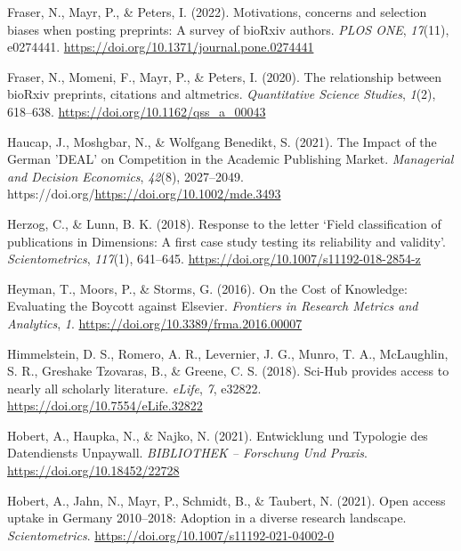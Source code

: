 \documentclass[
]{article}
\newlength{\cslhangindent}
\newlength{\cslentryspacingunit} %
\newenvironment{CSLReferences}[2] %
 {%
  \setlength{\parindent}{0pt}
  \ifodd #1
  \let\oldpar\par
  \def\par{\hangindent=\cslhangindent\oldpar}
  \fi
  \setlength{\parskip}{#2\cslentryspacingunit}
 }%
 {}
\begin{document}
\begin{CSLReferences}{1}{0}
\leavevmode{}%
Fraser, N., Mayr, P., \& Peters, I. (2022). Motivations, concerns and selection biases when posting preprints: {A} survey of {bioRxiv} authors. \emph{PLOS ONE}, \emph{17}(11), e0274441. \url{https://doi.org/10.1371/journal.pone.0274441}

\leavevmode{}%
Fraser, N., Momeni, F., Mayr, P., \& Peters, I. (2020). {The relationship between bioRxiv preprints, citations and altmetrics}. \emph{Quantitative Science Studies}, \emph{1}(2), 618--638. \url{https://doi.org/10.1162/qss_a_00043}

\leavevmode{}%
Haucap, J., Moshgbar, N., \& Wolfgang Benedikt, S. (2021). The {Impact} of the {German} '{DEAL}' on {Competition} in the {Academic} {Publishing} {Market}. \emph{Managerial and Decision Economics}, \emph{42}(8), 2027--2049. https://doi.org/\url{https://doi.org/10.1002/mde.3493}

\leavevmode{}%
Herzog, C., \& Lunn, B. K. (2018). Response to the letter {`{Field} classification of publications in {Dimensions}: A first case study testing its reliability and validity'}. \emph{Scientometrics}, \emph{117}(1), 641--645. \url{https://doi.org/10.1007/s11192-018-2854-z}

\leavevmode{}%
Heyman, T., Moors, P., \& Storms, G. (2016). On the {Cost} of {Knowledge}: {Evaluating} the {Boycott} against {Elsevier}. \emph{Frontiers in Research Metrics and Analytics}, \emph{1}. \url{https://doi.org/10.3389/frma.2016.00007}

\leavevmode{}%
Himmelstein, D. S., Romero, A. R., Levernier, J. G., Munro, T. A., McLaughlin, S. R., Greshake Tzovaras, B., \& Greene, C. S. (2018). Sci-{Hub} provides access to nearly all scholarly literature. \emph{eLife}, \emph{7}, e32822. \url{https://doi.org/10.7554/eLife.32822}

\leavevmode{}%
Hobert, A., Haupka, N., \& Najko, N. (2021). Entwicklung und {Typologie} des {Datendiensts} {Unpaywall}. \emph{BIBLIOTHEK -- Forschung Und Praxis}. \url{https://doi.org/10.18452/22728}

\leavevmode{}%
Hobert, A., Jahn, N., Mayr, P., Schmidt, B., \& Taubert, N. (2021). Open access uptake in {Germany} 2010--2018: Adoption in a diverse research landscape. \emph{Scientometrics}. \url{https://doi.org/10.1007/s11192-021-04002-0}


\end{CSLReferences}
\end{document}
